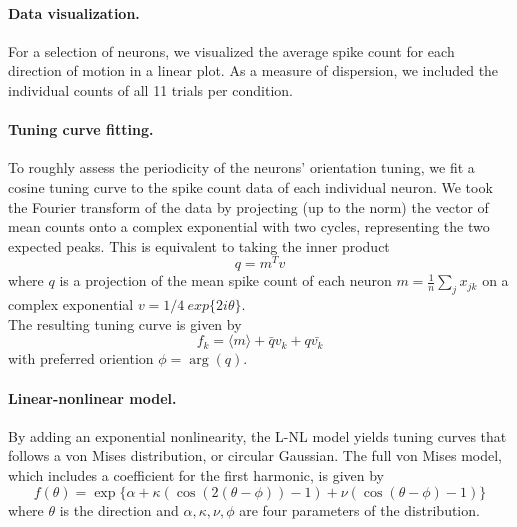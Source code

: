 \documentclass[10pt]{article}
\begin{document}
\paragraph{Data visualization.} For a selection of neurons, we visualized the average spike count for each direction of motion in a linear plot. As a measure of dispersion, we included the individual counts of all 11 trials per condition.

\paragraph{Tuning curve fitting.} To roughly assess the periodicity of the neurons' orientation tuning, we fit a cosine tuning curve to the spike count data of each individual neuron. We took the Fourier transform of the data by projecting (up to the norm) the vector of mean counts onto a complex exponential with two cycles, representing the two expected peaks. This is equivalent to taking the inner product
\begin{equation*}
q = m^Tv
\end{equation*}
where $q$ is a projection of the mean spike count of each neuron $m = \frac{1}{n} \sum_j x_{jk}$ on a complex exponential $v = 1/4\ exp \{2i \theta\} $. \\
The resulting tuning curve is given by
\begin{equation*}
f_k = \langle m \rangle + \bar{q} v_k + q \bar{v_k} 
\end{equation*}
with preferred oriention $\phi = \arg(q)$.

\paragraph{Linear-nonlinear model.} By adding an exponential nonlinearity, the L-NL model yields tuning curves that follows a von Mises distribution, or circular Gaussian. The full von Mises model, which includes a coefficient for the first harmonic, is given by
\begin{equation*}
f(\theta) = \exp\{ \alpha+\kappa(\cos(2(\theta-\phi))-1)+\nu(\cos(\theta-\phi)-1)\}
\end{equation*}
where $\theta$ is the direction and  $\alpha, \kappa, \nu, \phi$ are four parameters of the distribution. \\
\end{document}
